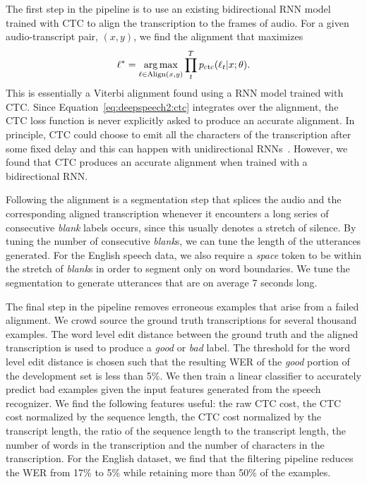 The first step in the pipeline is to use an existing bidirectional RNN model
trained with CTC to align the transcription to the frames of audio. For a given
audio-transcript pair, $(x, y)$, we find the alignment that maximizes
\begin{equation*}
\ell^* = \operatorname*{arg\,max}_{\ell \in \text{Align}(x,y)} \prod_t^T p_{\text{ctc}}(\ell_t | x; \theta).
\end{equation*}
This is essentially a Viterbi alignment found using a RNN model trained with
CTC. Since Equation~\ref{eq:deepspeech2:ctc} integrates over the alignment, the
CTC loss function is never explicitly asked to produce an accurate alignment.
In principle, CTC could choose to emit all the characters of the transcription
after some fixed delay and this can happen with unidirectional
RNNs~\cite{sak2015}. However, we found that CTC produces an accurate alignment
when trained with a bidirectional RNN.

Following the alignment is a segmentation step that splices the audio and the
corresponding aligned transcription whenever it encounters a long series of
consecutive \emph{blank} labels occurs, since this usually denotes a stretch of
silence. By tuning the number of consecutive \emph{blank}s, we can tune the
length of the utterances generated. For the English speech data, we also
require a \emph{space} token to be within the stretch of \emph{blank}s in order
to segment only on word boundaries. We tune the segmentation to generate
utterances that are on average 7 seconds long.

The final step in the pipeline removes erroneous examples that arise from a
failed alignment. We crowd source the ground truth transcriptions for several
thousand examples. The word level edit distance between the ground truth and
the aligned transcription is used to produce a \emph{good} or \emph{bad} label.
The threshold for the word level edit distance is chosen such that the
resulting WER of the \emph{good} portion of the development set is less than
5\%. We then train a linear classifier to accurately predict bad examples given
the input features generated from the speech recognizer. We find the following
features useful: the raw CTC cost, the CTC cost normalized by the sequence
length, the CTC cost normalized by the transcript length, the ratio of the
sequence length to the transcript length, the number of words in the
transcription and the number of characters in the transcription. For the
English dataset, we find that the filtering pipeline reduces the WER from 17\%
to 5\% while retaining more than 50\% of the examples.

